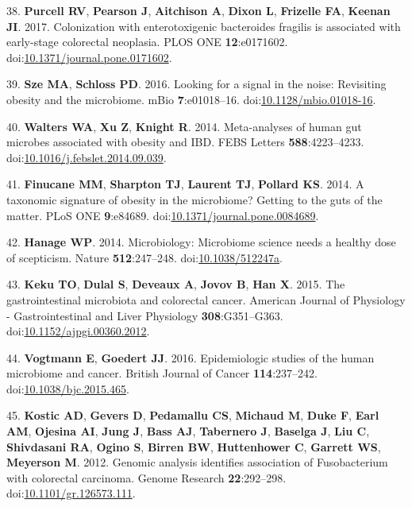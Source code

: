 \documentclass[12pt,]{article}
\begin{document}
\hypertarget{ref-Purcell2017}{}
38. \textbf{Purcell RV}, \textbf{Pearson J}, \textbf{Aitchison A},
\textbf{Dixon L}, \textbf{Frizelle FA}, \textbf{Keenan JI}. 2017.
Colonization with enterotoxigenic bacteroides fragilis is associated
with early-stage colorectal neoplasia. PLOS ONE \textbf{12}:e0171602.
doi:\href{https://doi.org/10.1371/journal.pone.0171602}{10.1371/journal.pone.0171602}.

\hypertarget{ref-Sze2016}{}
39. \textbf{Sze MA}, \textbf{Schloss PD}. 2016. Looking for a signal in
the noise: Revisiting obesity and the microbiome. mBio
\textbf{7}:e01018--16.
doi:\href{https://doi.org/10.1128/mbio.01018-16}{10.1128/mbio.01018-16}.

\hypertarget{ref-Walters2014}{}
40. \textbf{Walters WA}, \textbf{Xu Z}, \textbf{Knight R}. 2014.
Meta-analyses of human gut microbes associated with obesity and IBD.
FEBS Letters \textbf{588}:4223--4233.
doi:\href{https://doi.org/10.1016/j.febslet.2014.09.039}{10.1016/j.febslet.2014.09.039}.

\hypertarget{ref-Finucane2014}{}
41. \textbf{Finucane MM}, \textbf{Sharpton TJ}, \textbf{Laurent TJ},
\textbf{Pollard KS}. 2014. A taxonomic signature of obesity in the
microbiome? Getting to the guts of the matter. PLoS ONE
\textbf{9}:e84689.
doi:\href{https://doi.org/10.1371/journal.pone.0084689}{10.1371/journal.pone.0084689}.

\hypertarget{ref-Hanage2014}{}
42. \textbf{Hanage WP}. 2014. Microbiology: Microbiome science needs a
healthy dose of scepticism. Nature \textbf{512}:247--248.
doi:\href{https://doi.org/10.1038/512247a}{10.1038/512247a}.

\hypertarget{ref-keku_gastrointestinal_2015}{}
43. \textbf{Keku TO}, \textbf{Dulal S}, \textbf{Deveaux A},
\textbf{Jovov B}, \textbf{Han X}. 2015. The gastrointestinal microbiota
and colorectal cancer. American Journal of Physiology - Gastrointestinal
and Liver Physiology \textbf{308}:G351--G363.
doi:\href{https://doi.org/10.1152/ajpgi.00360.2012}{10.1152/ajpgi.00360.2012}.

\hypertarget{ref-vogtmann_epidemiologic_2016}{}
44. \textbf{Vogtmann E}, \textbf{Goedert JJ}. 2016. Epidemiologic
studies of the human microbiome and cancer. British Journal of Cancer
\textbf{114}:237--242.
doi:\href{https://doi.org/10.1038/bjc.2015.465}{10.1038/bjc.2015.465}.

\hypertarget{ref-kostic_genomic_2012}{}
45. \textbf{Kostic AD}, \textbf{Gevers D}, \textbf{Pedamallu CS},
\textbf{Michaud M}, \textbf{Duke F}, \textbf{Earl AM}, \textbf{Ojesina
AI}, \textbf{Jung J}, \textbf{Bass AJ}, \textbf{Tabernero J},
\textbf{Baselga J}, \textbf{Liu C}, \textbf{Shivdasani RA},
\textbf{Ogino S}, \textbf{Birren BW}, \textbf{Huttenhower C},
\textbf{Garrett WS}, \textbf{Meyerson M}. 2012. Genomic analysis
identifies association of Fusobacterium with colorectal carcinoma.
Genome Research \textbf{22}:292--298.
doi:\href{https://doi.org/10.1101/gr.126573.111}{10.1101/gr.126573.111}.
\end{document}
